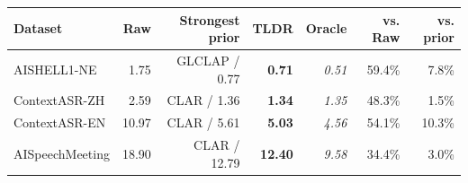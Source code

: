 \begin{table}[!t]
\begin{minipage}[t]{0.46\textwidth}
{\begin{tabular}{lrrrrrr}
\toprule
Dataset & Raw & Strongest prior & TLDR & Oracle & vs. Raw & vs. prior \\
\midrule
AISHELL1-NE & 1.75 & GLCLAP / 0.77 & \textcolor{resultorange}{\textbf{0.71}} & \textit{0.51} & 59.4\% & \textcolor{resultorange}{7.8\%} \\
ContextASR-ZH & 2.59 & CLAR / 1.36 & \textcolor{resultorange}{\textbf{1.34}} & \textit{1.35} & 48.3\% & \textcolor{resultorange}{1.5\%} \\
ContextASR-EN & 10.97 & CLAR / 5.61 & \textcolor{resultorange}{\textbf{5.03}} & \textit{4.56} & 54.1\% & \textcolor{resultorange}{10.3\%} \\
AISpeechMeeting & 18.90 & CLAR / 12.79 & \textcolor{resultorange}{\textbf{12.40}} & \textit{9.58} & 34.4\% & \textcolor{resultorange}{3.0\%} \\
\bottomrule
\end{tabular}
}
\end{minipage}
\end{table}
